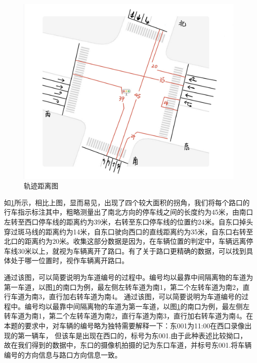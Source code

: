 \begin{figure}[h]
    \centering
    \includegraphics[scale=0.15]{figures/路口平面图.jpg}
    \caption{轨迹距离图}
    \label{fig:p2}
\end{figure}

如\ref{fig:p2}所示，相比上图，显而易见，出现了四个较大面积的拐角，我们将每个路口的行车指示标注其中，粗略测量出了南北方向的停车线之间的长度约为45米，由南口左转至西口停车线的距离约为39米，右转至东口停车线的位置约24米。自东口掉头穿过斑马线的距离约为14米，自东口驶向西口的直线距离约为35米，自东口右转至北口的距离约为20米。收集这部分数据是因为，在车辆位置的判定中，车辆远离停车线30米以上，就视为车辆离开了路口。有了关于路口更精确的数据，可以找到具体处于哪一位置时，视作车辆离开路口。

通过该图，可以简要说明为车道编号的过程中。编号均以最靠中间隔离物的车道为第一车道，以图\ref{fig:p2}的南口为例，最左侧左转车道为南1，第二个左转车道为南2，直行车道为南3，直行加右转车道为南4。
通过该图，可以简要说明为车道编号的过程中。编号均以最靠中间隔离物的车道为第一车道，以图\ref{fig:p2}的南口为例，最左侧左转车道为南1，第二个左转车道为南2，直行车道为南3，直行加右转车道为南4。在本题的要求中，对车辆的编号略为独特需要解释一下：东001为11:00在西口录像出现的第一辆车， 但该车是出现在西口的，标号为东001.由于此种表述比较拗口，故在我们得到的数据中，东口的摄像机拍摄的记为东口车道，并标号东001.将车辆编号的方向信息与路口方向信息一致。

